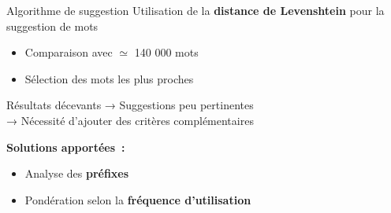 \begin{frame}{Algorithme de suggestion}
	Utilisation de la \textbf{distance de Levenshtein} pour la suggestion de mots

	\begin{itemize}
		\item Comparaison avec $\simeq$ 140 000 mots
		\item Sélection des mots les plus proches
	\end{itemize}

	\begin{block}{\alert{Résultats décevants}}
		→ Suggestions peu pertinentes\\
		→ Nécessité d’ajouter des critères complémentaires
	\end{block}

	\textbf{Solutions apportées~:}
	\begin{itemize}
		\item Analyse des \textbf{préfixes}
		\item Pondération selon la \textbf{fréquence d'utilisation}
	\end{itemize}
\end{frame}

